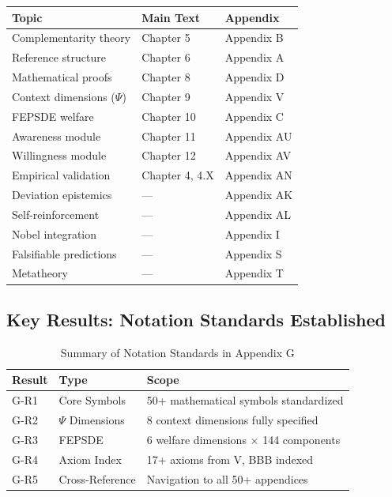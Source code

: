 \begin{center}
\renewcommand{\arraystretch}{1.2}
\begin{tabular}{lll}
\hline
\textbf{Topic} & \textbf{Main Text} & \textbf{Appendix} \\
\hline
Complementarity theory & Chapter 5 & Appendix B \\
Reference structure & Chapter 6 & Appendix A \\
Mathematical proofs & Chapter 8 & Appendix D \\
Context dimensions ($\Psi$) & Chapter 9 & Appendix V \\
FEPSDE welfare & Chapter 10 & Appendix C \\
Awareness module & Chapter 11 & Appendix AU \\
Willingness module & Chapter 12 & Appendix AV \\
Empirical validation & Chapter 4, 4.X & Appendix AN \\
Deviation epistemics & --- & Appendix AK \\
Self-reinforcement & --- & Appendix AL \\
Nobel integration & --- & Appendix I \\
Falsifiable predictions & --- & Appendix S \\
Metatheory & --- & Appendix T \\
\hline
\end{tabular}
\end{center}


\subsection{Key Results: Notation Standards Established}
\label{sec:glossary-results}

\begin{table}[htbp]
\centering
\caption{Summary of Notation Standards in Appendix G}
\label{tab:g-results}
\renewcommand{\arraystretch}{1.2}
\begin{tabular}{@{}llp{6cm}@{}}
\toprule
\textbf{Result} & \textbf{Type} & \textbf{Scope} \\
\midrule
G-R1 & Core Symbols & 50+ mathematical symbols standardized \\
G-R2 & $\Psi$ Dimensions & 8 context dimensions fully specified \\
G-R3 & FEPSDE & 6 welfare dimensions × 144 components \\
G-R4 & Axiom Index & 17+ axioms from V, BBB indexed \\
G-R5 & Cross-Reference & Navigation to all 50+ appendices \\
\bottomrule
\end{tabular}
\end{table}

